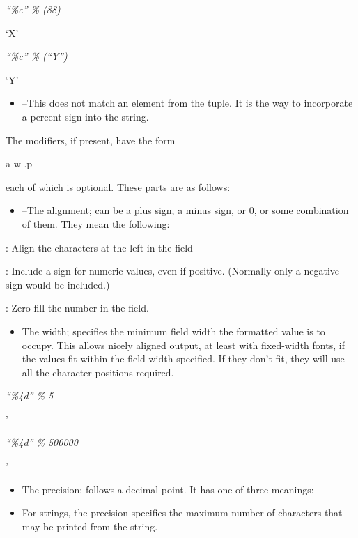 \emph{``\%c'' \% (88)}

`X'


\emph{``\%c'' \% (``Y'')}

`Y'

\begin{itemize}
\tightlist
\item
   --This does not match
  an element from the tuple. It is the way to incorporate a percent sign
  into the string.
\end{itemize}

The modifiers, if present, have the
form

a w .p

each of which is optional. These
parts are as follows:

\begin{itemize}
\tightlist
\item
   --The alignment; can be
  a plus sign, a minus sign, or 0, or some combination of them. They
  mean the following:
\end{itemize}

 : Align the characters at
the left in the field

 : Include a sign for
numeric values, even if positive. (Normally only a negative sign would
be included.)

 : Zero-fill the number in
the field.

\begin{itemize}
\tightlist
\item
   The width;
  specifies the minimum field width the formatted value is to occupy.
  This allows nicely aligned output, at least with fixed-width fonts, if
  the values fit within the field width specified. If they don't fit,
  they will use all the character positions required.
\end{itemize}


\emph{``\textbar{}\%4d\textbar{}'' \% 5}

'


\emph{``\textbar{}\%4d\textbar{}'' \% 500000}

'

\begin{itemize}
\tightlist
\item
   The
  precision; follows a decimal point. It has one of three meanings:
\item
  For strings, the precision
  specifies the maximum number of characters that may be printed from
  the string.
\end{itemize}


